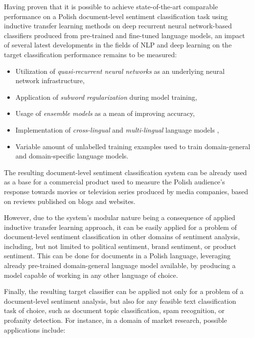 Having proven that it is possible to achieve state-of-the-art comparable performance on a Polish document-level sentiment classification task using inductive transfer learning methods on deep recurrent neural network-based classifiers produced from pre-trained and fine-tuned language models, an impact of several latest developments in the fields of NLP and deep learning on the target classification performance remains to be measured:

\begin{itemize}
\item Utilization of \emph{quasi-recurrent neural networks} as an underlying neural network infrastructure,
\item Application of \emph{subword regularization} during model training,
\item Usage of \emph{ensemble models} as a mean of improving accuracy,
\item Implementation of \emph{cross-lingual} and \emph{multi-lingual} language models \cite{howard:multifit},
\item Variable amount of unlabelled training examples used to train domain-general and domain-specific language models.
\end{itemize}

The resulting document-level sentiment classification system can be already used as a base for a commercial product used to measure the Polish audience's response towards movies or television series produced by media companies, based on reviews published on blogs and websites.

However, due to the system's modular nature being a consequence of applied inductive transfer learning approach, it can be easily applied for a problem of document-level sentiment classification in other domains of sentiment analysis, including, but not limited to political sentiment, brand sentiment, or product sentiment. This can be done for documents in a Polish language, leveraging already pre-trained domain-general language model available, by producing a model capable of working in any other language of choice.

Finally, the resulting target classifier can be applied not only for a problem of a document-level sentiment analysis, but also for any feasible text classification task of choice, such as document topic classification, spam recognition, or profanity detection. For instance, in a domain of market research, possible applications include:

